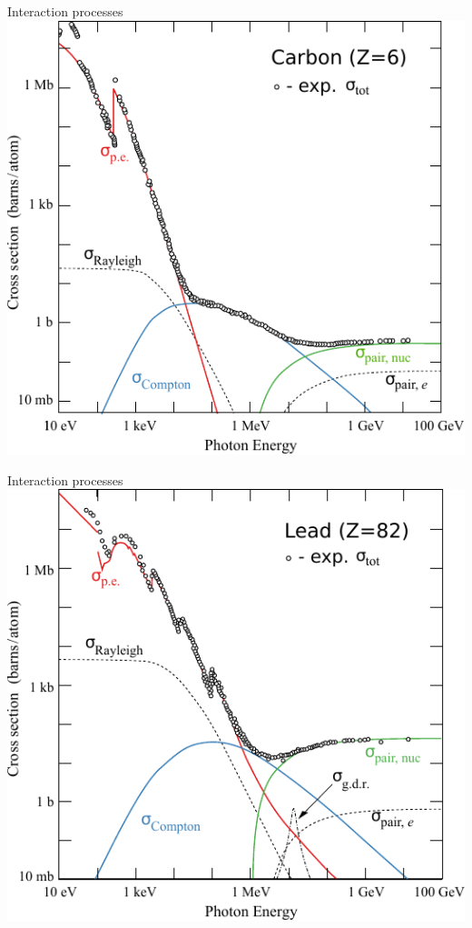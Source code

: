 \documentclass[11pt,xcolor=dvipsnames,professionalfonts,notes]{beamer}
\begin{document}
\begin{frame}{Interaction processes}
	\centering
	\includegraphics[scale=0.9]{./figures/carbon.pdf}
\end{frame}
\begin{frame}{Interaction processes}
	\centering
	\includegraphics[scale=0.9]{./figures/lead.pdf}
\end{frame}
\end{document}
